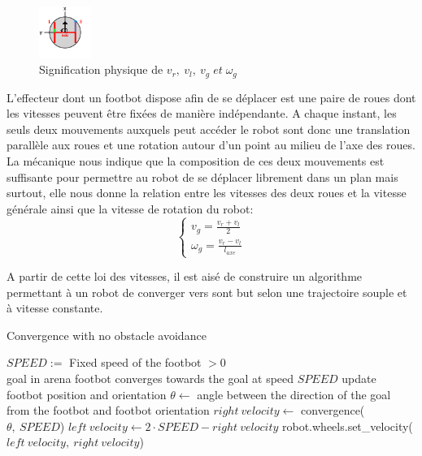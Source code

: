 \documentclass[a4paper,11pt]{report}
\begin{document}
\begin{figure}
  \vspace{-30pt}
  \begin{center}
    \includegraphics[width=0.15\textwidth]{robotWheels.png}
  \end{center}
  \caption{Signification physique de \(v_r,\: v_l,\: v_g \; et \; \omega_g \) \cite{argosSite1}}
\end{figure}
L'effecteur dont un footbot dispose afin de se déplacer est une paire de roues dont les vitesses peuvent être fixées de manière indépendante. A chaque instant, les seuls deux mouvements auxquels peut accéder le robot sont donc une translation parallèle aux roues et une rotation autour d'un point au milieu de l'axe des roues. La mécanique\cite{meca} nous indique que la composition de ces deux mouvements est suffisante pour permettre au robot de se déplacer librement dans un plan mais surtout, elle nous donne la relation entre les vitesses des deux roues et la vitesse générale ainsi que la vitesse de rotation du robot:
\begin{equation}
\begin{cases}
v_g=\frac{v_r+v_l}{2}\\
\omega_g=\frac{v_r-v_l}{l_{axe}}
\end{cases}  
\end{equation}

A partir de cette loi des vitesses, il est aisé de construire un algorithme permettant à un robot de converger vers sont but selon une trajectoire souple et à vitesse constante.
\begin{algorithm}                    
\caption{Convergence with no obstacle avoidance}
\label{simpleConvergence}
\begin{algorithmic}[1]
  \REQUIRE \(SPEED :=\) Fixed speed of the footbot \(> 0\)\\goal in arena
  \ENSURE footbot converges towards the goal at speed \(SPEED\)
    \STATE update footbot position and orientation
    \STATE \( \theta \leftarrow\) angle between the direction of the goal from the footbot and footbot orientation
    \STATE \( right\:velocity \leftarrow\) convergence(\(\theta,\:SPEED\))
    \STATE \( left\:velocity \leftarrow 2\cdot SPEED-right\:velocity\) 
    \STATE robot.wheels.set\_velocity(\(left\:velocity,\:right\:velocity\))
  \ENDWHILE
\end{algorithmic}
\end{algorithm}
\end{document}
